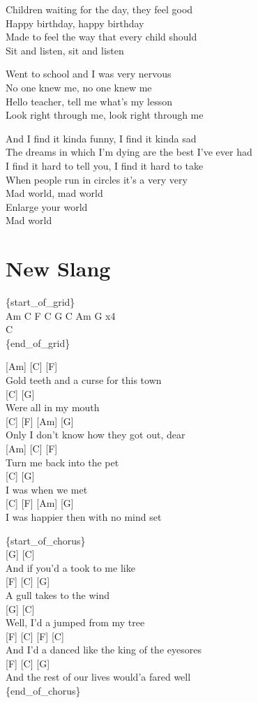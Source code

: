 \documentclass[
  letterpaper,
  DIV=11,
  numbers=noendperiod]{scrreprt}
\begin{document}
Children waiting for the day, they feel good\\
Happy birthday, happy birthday\\
Made to feel the way that every child should\\
Sit and listen, sit and listen

Went to school and I was very nervous\\
No one knew me, no one knew me\\
Hello teacher, tell me what's my lesson\\
Look right through me, look right through me

And I find it kinda funny, I find it kinda sad\\
The dreams in which I'm dying are the best I've ever had\\
I find it hard to tell you, I find it hard to take\\
When people run in circles it's a very very\\
Mad world, mad world\\
Enlarge your world\\
Mad world

\hypertarget{new-slang}{%
\chapter{New Slang}\label{new-slang}}

\{start\_of\_grid\}\\
Am C F C G C Am G x4\\
C\\
\{end\_of\_grid\}

{[}Am{]} {[}C{]} {[}F{]}\\
Gold teeth and a curse for this town\\
{[}C{]} {[}G{]}\\
Were all in my mouth\\
{[}C{]} {[}F{]} {[}Am{]} {[}G{]}\\
Only I don't know how they got out, dear\\
{[}Am{]} {[}C{]} {[}F{]}\\
Turn me back into the pet\\
{[}C{]} {[}G{]}\\
I was when we met\\
{[}C{]} {[}F{]} {[}Am{]} {[}G{]}\\
I was happier then with no mind set

\{start\_of\_chorus\}\\
{[}G{]} {[}C{]}\\
And if you'd a took to me like\\
{[}F{]} {[}C{]} {[}G{]}\\
A gull takes to the wind\\
{[}G{]} {[}C{]}\\
Well, I'd a jumped from my tree\\
{[}F{]} {[}C{]} {[}F{]} {[}C{]}\\
And I'd a danced like the king of the eyesores\\
{[}F{]} {[}C{]} {[}G{]}\\
And the rest of our lives would'a fared well\\
\{end\_of\_chorus\}
\end{document}
